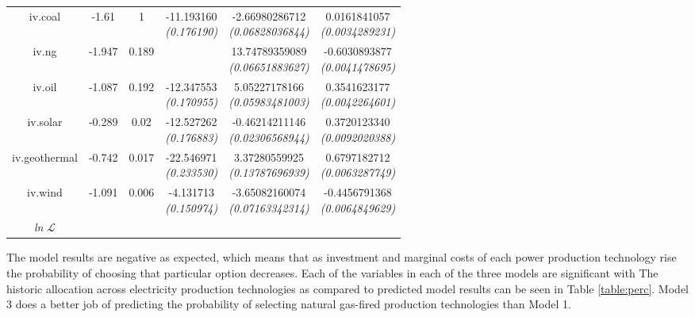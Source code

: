 \documentclass[10pt]{amsart}
\begin{document}
\begin{table}[H]
\begin{tabular}{c c c c c c}
iv.coal & -1.61 & 1 & \makecell{-11.193160 \\ {\footnotesize\textit{(0.176190)}}} & \makecell{-2.66980286712 \\ {\footnotesize\textit{(0.06828036844)}}} & \makecell{0.0161841057 \\ {\footnotesize\textit{(0.0034289231)}}} \\
iv.ng & -1.947 & 0.189 & & \makecell{13.74789359089 \\ {\footnotesize\textit{(0.06651883627)}}} & \makecell{-0.6030893877 \\ {\footnotesize\textit{(0.0041478695)}}} \\
iv.oil & -1.087 & 0.192 & \makecell{-12.347553 \\ {\footnotesize\textit{(0.170955)}}} & \makecell{5.05227178166 \\ {\footnotesize\textit{(0.05983481003)}}} & \makecell{0.3541623177 \\ {\footnotesize\textit{(0.0042264601)}}} \\
iv.solar & -0.289 & 0.02 & \makecell{-12.527262 \\ {\footnotesize\textit{(0.176883)}}} & \makecell{-0.46214211146 \\ {\footnotesize\textit{(0.02306568944)}}} & \makecell{0.3720123340 \\ {\footnotesize\textit{(0.0092020388)}}} \\
iv.geothermal & -0.742 & 0.017 & \makecell{-22.546971 \\ {\footnotesize\textit{(0.233530)}}} & \makecell{3.37280559925 \\ {\footnotesize\textit{(0.13787696939)}}} & \makecell{0.6797182712 \\ {\footnotesize\textit{(0.0063287749)}}} \\
iv.wind & -1.091 & 0.006 & \makecell{-4.131713 \\ {\footnotesize\textit{(0.150974)}}} & \makecell{-3.65082160074 \\ {\footnotesize\textit{(0.07163342314)}}} & \makecell{-0.4456791368 \\ {\footnotesize\textit{(0.0064849629)}}} \\ 
\hline
\textit{ln} $\mathcal{L}$ & & & \\ [1ex]
\hline
\hline
\end{tabular}
\label{table:nl.1}
\end{table}

The model results are negative as expected, which means that as investment and marginal costs of each power production technology rise the probability of choosing that particular option decreases. 
Each of the variables in each of the three models are significant with 
The historic allocation across electricity production technologies as compared to predicted model results can be seen in Table \ref{table:perc}.
Model 3 does a better job of predicting the probability of selecting natural gas-fired production technologies than Model 1.  
\end{document}
